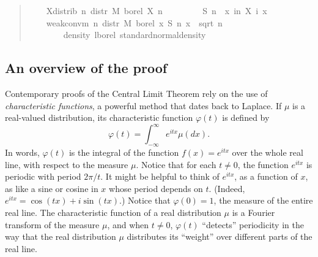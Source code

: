 \documentclass{svjour3}
\newcommand{\ph}{\varphi}
\begin{document}
\begin{quote}
\begin{isabellebody}
\ \ \ \ X{\isacharunderscore}distrib{\isacharcolon}\ {\isachardoublequoteopen}{\isasymAnd}n{\isachardot}\ distr\ M\ borel\ {\isacharparenleft}X\ n{\isacharparenright}\ {\isacharequal}\ {\isasymmu}{\isachardoublequoteclose}\isanewline
\ \ \isanewline
\ \ \ \ {\isachardoublequoteopen}S\ n\ {\isasymequiv}\ {\isasymlambda}x{\isachardot}\ {\isasymSum}i{\isacharless}n{\isachardot}\ X\ i\ x{\isachardoublequoteclose}\isanewline
\ \ \isanewline
\ \ \ \ {\isachardoublequoteopen}weak{\isacharunderscore}conv{\isacharunderscore}m\ {\isacharparenleft}{\isasymlambda}n{\isachardot}\ distr\ M\ borel\ {\isacharparenleft}{\isasymlambda}x{\isachardot}\ S\ n\ x\ {\isacharslash}\ sqrt\ {\isacharparenleft}n\ {\isacharasterisk}\ {\isasymsigma}\ \isanewline
\ \ \ \ \ \ \ \ {\isacharparenleft}density\ lborel\ standard{\isacharunderscore}normal{\isacharunderscore}density{\isacharparenright}{\isachardoublequoteclose}
\end{isabellebody}
\end{quote}

\subsection{An overview of the proof}
\label{subsection:overview}

Contemporary proofs of the Central Limit Theorem rely on the use of \emph{characteristic functions}, a powerful method that dates back to Laplace. If $\mu$ is a real-valued distribution, its characteristic function $\ph(t)$ is defined by
\[
\ph(t) = \int_{-\infty}^{\infty} e^{itx} \mu(dx).
\]
In words, $\ph(t)$ is the integral of the function $f(x) = e^{itx}$ over the whole real line, with respect to the measure $\mu$. Notice that for each $t \neq 0$, the function $e^{itx}$ is periodic with period $2 \pi / t$. It might be helpful to think of $e^{itx}$, as a function of $x$, as like a sine or cosine in $x$ whose period depends on $t$. (Indeed, $e^{itx}= \cos (t x) + i \sin (t x)$.) Notice that $\ph(0) = 1$, the measure of the entire real line. The characteristic function of a real distribution $\mu$ is a Fourier transform of the measure $\mu$, and when $t \neq 0$, $\ph(t)$ ``detects'' periodicity in the way that the real distribution $\mu$ distributes its ``weight'' over different parts of the real line.
\end{document}
